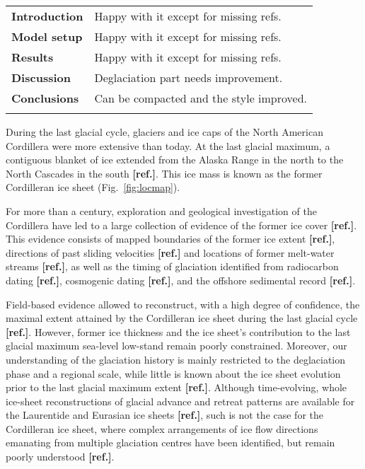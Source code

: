 \documentclass[tc, manuscript]{copernicus}
\newcommand{\aref}[0]{\textbf{[ref.]}}
\begin{document}
\begin{center}
\begin{tabular}{>{\bfseries}ll}
    \tophline
    Introduction & Happy with it except for missing refs.\\
    Model setup  & Happy with it except for missing refs.\\
    Results      & Happy with it except for missing refs.\\
    Discussion   & Deglaciation part needs improvement.\\
    Conclusions  & Can be compacted and the style improved.\\
    \bottomhline
\end{tabular}
\end{center}

\introduction
\label{sec:intro}

During the last glacial cycle, glaciers and ice caps of the North American
Cordillera were more extensive than today. At the last glacial maximum, a
contiguous blanket of ice extended from the Alaska Range in the north to the
North Cascades in the south \aref. This ice mass is known as the former
Cordilleran ice sheet (Fig.~\ref{fig:locmap}).

For more than a century, exploration and geological investigation of the
Cordillera have led to a large collection of evidence of the former ice cover
\aref. This evidence consists of mapped boundaries of the former ice extent
\aref, directions of past sliding velocities {\aref} and locations of former
melt-water streams \aref, as well as the timing of glaciation identified from
radiocarbon dating \aref, cosmogenic dating \aref, and the offshore sedimental
record \aref.

Field-based evidence allowed to reconstruct, with a high degree of confidence,
the maximal extent attained by the Cordilleran ice sheet during the last glacial
cycle \aref. However, former ice thickness and the ice sheet's contribution to the
last glacial maximum sea-level low-stand remain poorly constrained. Moreover,
our understanding of the glaciation history is mainly restricted to the
deglaciation phase and a regional scale, while little is known about the ice
sheet evolution prior to the last glacial maximum extent \aref. Although
time-evolving, whole ice-sheet reconstructions of glacial advance and retreat
patterns are available for the Laurentide and Eurasian ice sheets \aref, such is not
the case for the Cordilleran ice sheet, where complex arrangements of ice flow
directions emanating from multiple glaciation centres have been identified, but
remain poorly understood \aref.
\end{document}

